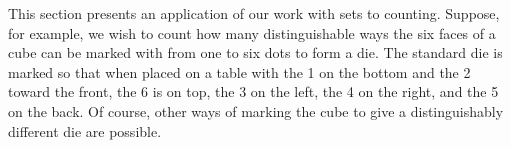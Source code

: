 \documentclass[11pt,oneside]{article}
\begin{document}
\fi
\renewcommand{\BookFooter}{Section 15 Applications of G-Sets to Counting}
\ifdefined\BookMaster\else\setcounter{page}{140}\fi
\BookNarrativetrue

\begin{BookBody}


\noindent This section presents an application of our work with sets to counting. Suppose, for example, we wish to count how many distinguishable ways the six faces of a cube can be marked with from one to six dots to form a die. The standard die is marked so that when placed on a table with the 1 on the bottom and the 2 toward the front, the 6 is on top, the 3 on the left, the 4 on the right, and the 5 on the back. Of course, other ways of marking the cube to give a distinguishably different die are possible.

\end{BookBody}

\BookNarrativetrue
\end{document}

